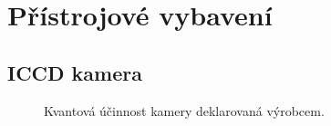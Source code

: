\chapter{Přístrojové vybavení}
\label{sec:instruments}

\section{ICCD kamera}
\label{sec:instruments-iccd}

\begin{figure}[htp]
	\centering
	
	\caption{Kvantová účinnost kamery deklarovaná výrobcem.}
	\label{fig:instruments-cameraeff}
\end{figure}
